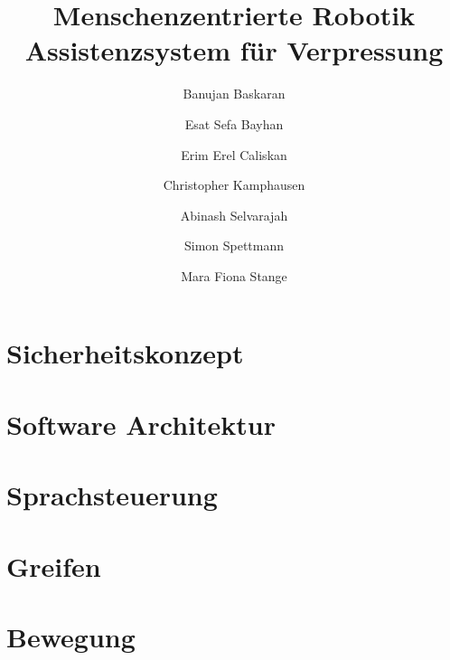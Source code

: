 \documentclass{article}
\title{
    Menschenzentrierte Robotik \\
    Assistenzsystem für Verpressung}
\author{
    Banujan Baskaran \and
    Esat Sefa Bayhan \and
    Erim Erel Caliskan \and
    Christopher Kamphausen \and
    Abinash Selvarajah \and
    Simon Spettmann \and
    Mara Fiona Stange 
}
\begin{document}
\maketitle
\tableofcontents

\section{Sicherheitskonzept}


\section{Software Architektur}


\section{Sprachsteuerung}


\section{Greifen}


\section{Bewegung}

\end{document}

